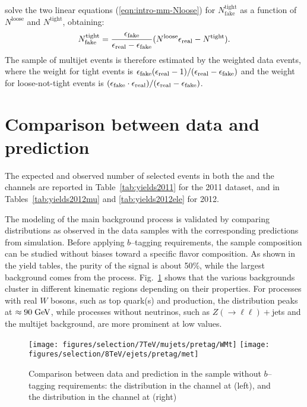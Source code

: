solve the two linear equations (\ref{eqn:intro-mm-Nloose}) for
$N^{\mathrm{tight}}_\mathrm{fake}$ as a function of $N^\mathrm{loose}$
and $N^\mathrm{tight}$, obtaining:
%                                                                                             
\begin{equation}
  N^\mathrm{tight}_\mathrm{fake}
  = \frac{\epsilon_{\mathrm{fake}}{}}
  {\epsilon_{\mathrm{real}}{} - \epsilon_{\mathrm{fake}}{}}
  (N^\mathrm{loose} \epsilon_{\mathrm{real}}{} - N^\mathrm{tight}).
  \label{eqn:intro-mm-tight_fake}
\end{equation}
%                                                                                             
The sample of multijet events is therefore estimated by the weighted
data events, where the weight for tight events is
$\epsilon_{\mathrm{fake}}{}(\epsilon_{\mathrm{real}}{}-1)/(\epsilon_{\mathrm{real}}{}-\epsilon_{\mathrm{fake}}{})$
and the weight for loose-not-tight events is
$(\epsilon_{\mathrm{fake}}{}\cdot{}\epsilon_{\mathrm{real}}{})/(\epsilon_{\mathrm{real}}{}-\epsilon_{\mathrm{fake}}{})$.

\section{Comparison between data and prediction}
\label{sec:datamc}

The expected and observed number of selected events in both the
\mujets{} and the \ejets{} channels are reported in
Table~\ref{tab:yields2011} for the 2011 dataset, and in
Tables~\ref{tab:yields2012mu} and \ref{tab:yields2012ele}  for 2012.



The modeling of the main background process is validated by comparing
distributions as observed in the data samples with the corresponding
predictions from simulation. 
Before applying $b$--tagging requirements, the sample composition can
be studied without biases toward a specific flavor composition. As
shown in the yield tables, the purity of the \ttbar{} signal is about
50\%, while the largest background comes from the \wjets{}
process. Fig.~\ref{fig:pretagdatamc} shows that the various
backgrounds cluster in different kinematic regions depending on their
properties. For processes with real $W$ bosons, such as top quark(s)
and \wjets{} production, the \mtw{} distribution peaks at
$\approx90\; \mathrm{GeV}{}$, while processes without neutrinos, such as
$Z(\to\ell\ell)+$jets and the multijet background, are more prominent
at low \met{} values.
 
\begin{figure}\centering
  \texttt{[image: figures/selection/7TeV/mujets/pretag/WMt]}
  \texttt{[image: figures/selection/8TeV/ejets/pretag/met]}
  \caption{
    Comparison between data and prediction in the sample without
    $b$--tagging requirements: the \mtw{} distribution in the
    \mujets{} channel at \seventev{} (left), and the \met{} distribution in
    the \ejets{} channel at \eighttev{} (right)}
  \label{fig:pretagdatamc}
\end{figure}

